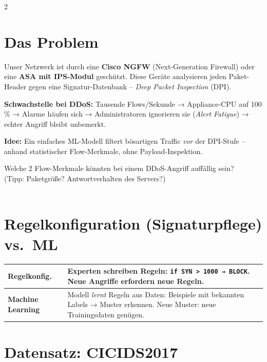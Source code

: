 \documentclass[a4paper, 10pt]{article}
\newcommand{\uebung}[2]{%
  \begin{tcolorbox}[uebstyle, title={Übung #1}]%
  \small #2%
  \end{tcolorbox}%
}
\begin{document}
\begin{multicols}{2}

\section{Das Problem}

Unser Netzwerk ist durch eine \textbf{Cisco NGFW} (Next-Generation Firewall)
oder eine \textbf{ASA mit IPS-Modul} geschützt. Diese Geräte analysieren
jeden Paket-Header gegen eine Signatur-Datenbank –
\emph{Deep Packet Inspection} (DPI).

\textbf{Schwachstelle bei DDoS:}
Tausende Flows/Sekunde → Appliance-CPU auf 100\,\% → Alarme häufen sich
→ Administratoren ignorieren sie (\emph{Alert Fatigue})
→ echter Angriff bleibt unbemerkt.

\textbf{Idee:} Ein einfaches ML-Modell filtert bösartigen Traffic
\emph{vor} der DPI-Stufe – anhand statistischer Flow-Merkmale,
ohne Payload-Inspektion.

\uebung{1}{%
  Welche 2 Flow-Merkmale könnten bei einem DDoS-Angriff auffällig sein?\\
  (Tipp: Paketgröße? Antwortverhalten des Servers?)\\[8pt]
  \dotfill\\[6pt]
  \dotfill
}

\section{Regelkonfiguration (Signaturpflege) vs.\ ML}

\begin{tabularx}{\linewidth}{@{}p{2.3cm}X@{}}
\toprule
\textbf{Regelkonfig.} &
  Experten schreiben Regeln:
  \texttt{if SYN > 1000 → BLOCK}.
  Neue Angriffe erfordern neue Regeln.\\
\midrule
\textbf{Machine Learning} &
  Modell \emph{lernt} Regeln aus Daten:
  Beispiele mit bekannten Labels → Muster erkennen.
  Neue Muster: neue Trainingsdaten genügen.\\
\bottomrule
\end{tabularx}

\section{Datensatz: CICIDS2017}


\end{multicols}
\end{document}
